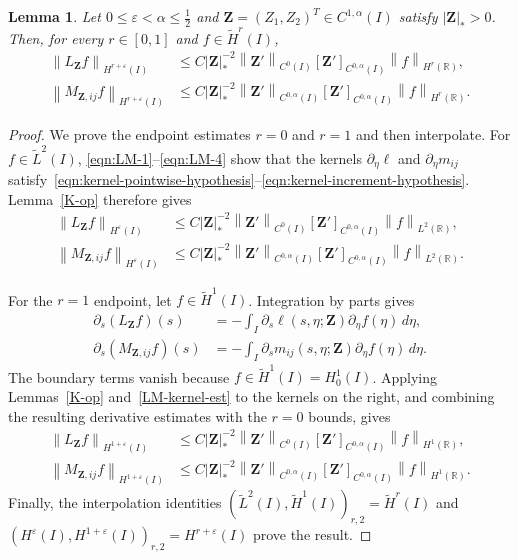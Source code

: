 \documentclass[11pt,reqno]{amsart}
\theoremstyle{plain}
\newtheorem{lemma}[theorem]{Lemma}
\theoremstyle{definition}
\numberwithin{equation}{section}
\newcommand{\paren}[1]{\left(#1\right)}
\newcommand{\p}{\partial}
\newcommand{\wt}[1]{\widetilde{#1}}
\newcommand{\bm}[1]{\boldsymbol{#1}}
\newcommand{\abs}[1]{\left\lvert #1 \right\rvert}
\newcommand{\norm}[1]{\left\lVert #1 \right\rVert}
\newcommand{\R}{\mathbb{R}}
\newcommand{\ci}[1]{C^{#1}(I)}
\newcommand{\hi}[1]{H^{#1}(I)}
\newcommand{\thi}[1]{\wt H^{#1}(I)}
\begin{document}
\begin{lemma}\label{LM-op-est}
Let $0\le\varepsilon<\alpha\le\frac12$ and
$\bm Z=(Z_1,Z_2)^T\in\ci{1,\alpha}$ satisfy $\abs{\bm Z}_*>0$.
Then, for every $r\in[0,1]$ and $f\in\thi{r}$,
\begin{align}
    \norm{L_{\bm Z}f}_{H^{r+\varepsilon}(I)}
    &\le C\abs{\bm Z}_*^{-2}\norm{\bm Z'}_{\ci{0}}[\bm Z']_{\ci{0,\alpha}}\norm{f}_{H^r(\R)}, \\
    \norm{M_{\bm Z,ij}f}_{H^{r+\varepsilon}(I)}
    &\le C\abs{\bm Z}_*^{-2}\norm{\bm Z'}_{\ci{0,\alpha}}[\bm Z']_{\ci{0,\alpha}}\norm{f}_{H^r(\R)}.
\end{align}
\end{lemma}
\begin{proof}
We prove the endpoint estimates $r=0$ and $r=1$ and then interpolate.
For $f\in\wt L^2(I)$, \eqref{eqn:LM-1}--\eqref{eqn:LM-4} show that
the kernels $\p_\eta\ell$ and $\p_\eta m_{ij}$ satisfy~\eqref{eqn:kernel-pointwise-hypothesis}--\eqref{eqn:kernel-increment-hypothesis}. Lemma~\ref{K-op} therefore gives
\begin{align}
    \norm{L_{\bm Z}f}_{\hi{\varepsilon}}
    &\le C\abs{\bm Z}_*^{-2}\norm{\bm Z'}_{\ci{0}}[\bm Z']_{\ci{0,\alpha}}\norm{f}_{L^2(\R)},\\
    \norm{M_{\bm Z,ij}f}_{\hi{\varepsilon}}
    &\le C\abs{\bm Z}_*^{-2}\norm{\bm Z'}_{\ci{0,\alpha}}[\bm Z']_{\ci{0,\alpha}}\norm{f}_{L^2(\R)}.
\end{align}

For the $r=1$ endpoint, let $f\in\wt H^1(I)$. Integration by parts gives
\begin{align}
    \p_s(L_{\bm Z}f)(s)
    &=-\int_I\p_s\ell(s,\eta;\bm Z)\p_\eta f(\eta)\,d\eta,\\
    \p_s(M_{\bm Z,ij}f)(s)
    &=-\int_I\p_sm_{ij}(s,\eta;\bm Z)\p_\eta f(\eta)\,d\eta.
\end{align}
The boundary terms vanish because $f\in\wt H^1(I)=H_0^1(I)$. Applying
Lemmas~\ref{K-op} and~\ref{LM-kernel-est} to the kernels on the right,
and combining the resulting derivative estimates with the $r=0$ bounds,
gives
\begin{align}
    \norm{L_{\bm Z}f}_{\hi{1+\varepsilon}}
    &\le C\abs{\bm Z}_*^{-2}\norm{\bm Z'}_{\ci{0}}[\bm Z']_{\ci{0,\alpha}}\norm{f}_{H^1(\R)},\\
    \norm{M_{\bm Z,ij}f}_{\hi{1+\varepsilon}}
    &\le C\abs{\bm Z}_*^{-2}\norm{\bm Z'}_{\ci{0,\alpha}}[\bm Z']_{\ci{0,\alpha}}\norm{f}_{H^1(\R)}.
\end{align}
Finally, the interpolation identities
$\paren{\wt L^2(I),\wt H^1(I)}_{r,2}=\wt H^r(I)$ and
$\paren{H^\varepsilon(I),H^{1+\varepsilon}(I)}_{r,2}
=H^{r+\varepsilon}(I)$ prove the result.
\end{proof}
\end{document}
